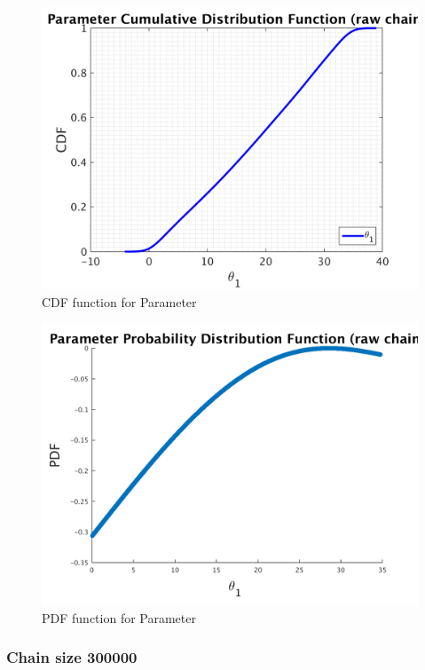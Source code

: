 \begin{figure}[h!]
  
  \centering
   \includegraphics[scale=0.75]{output_100000/simple_ip_cdf_raw}
   \caption{CDF function for Parameter }
\end{figure}



\begin{figure}[h!]
  
  \centering
   \includegraphics[scale=0.75]{output_100000/ip_logLike_unified}
   \caption{PDF function for Parameter }
\end{figure}


\subsubsection{Chain size 300000 }


